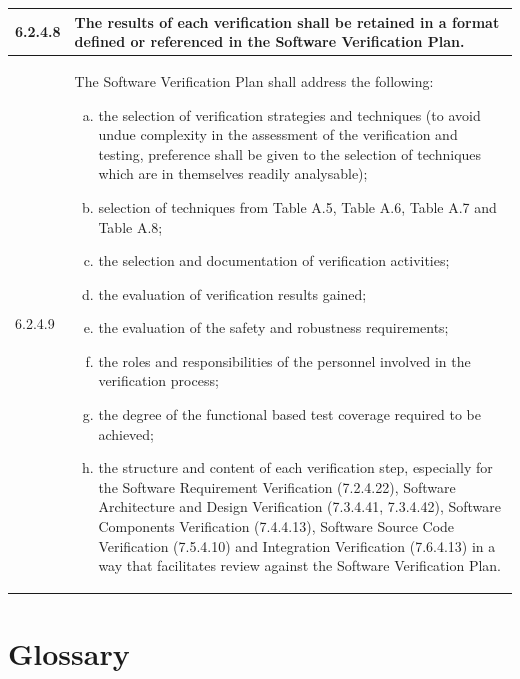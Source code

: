 \documentclass{template/openetcs_report}
\begin{document}
{\begin{longtable}{||p{}|p{}||}
    \\
    \hline 6.2.4.8 & The results of each verification shall be
    retained in a format defined or referenced in the Software
    Verification Plan.
    \\
    \hline 6.2.4.9 & The Software Verification Plan shall address the
    following:
    \begin{enumerate}[a)]
    \item the selection of verification strategies and techniques (to
      avoid undue complexity in the assessment of the verification and
      testing, preference shall be given to the selection of
      techniques which are in themselves readily analysable);
    \item selection of techniques from Table A.5, Table A.6, Table A.7
      and Table A.8;
    \item  the selection and documentation of verification activities;  
    \item  the evaluation of verification results gained;   
    \item  the evaluation of the safety and robustness requirements;  
    \item the roles and responsibilities of the personnel involved in
      the verification process;
    \item the degree of the functional based test coverage required to
      be achieved;
    \item the structure and content of each verification step,
      especially for the Software Requirement Verification (7.2.4.22),
      Software Architecture and Design Verification (7.3.4.41,
      7.3.4.42), Software Components Verification (7.4.4.13), Software
      Source Code Verification (7.5.4.10) and Integration Verification
      (7.6.4.13) in a way that facilitates review against the Software
      Verification Plan.
    \end{enumerate}
    \\
    \hline
\end{longtable}}


\section{Glossary}
\label{sec:glossary}
\end{document}
